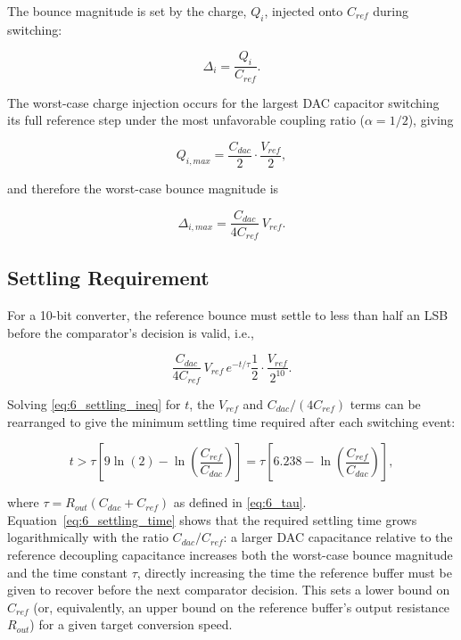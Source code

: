 The bounce magnitude is set by the charge, $Q_i$, injected onto $C_{ref}$
during switching:

\begin{equation}
	\Delta_i = \frac{Q_i}{C_{ref}}.
	\label{eq:6_delta_i}
\end{equation}

The worst-case charge injection occurs for the largest DAC capacitor
switching its full reference step under the most unfavorable coupling
ratio ($\alpha = 1/2$), giving

\begin{equation}
	Q_{i,max} = \frac{C_{dac}}{2} \cdot \frac{V_{ref}}{2},
	\label{eq:6_qimax}
\end{equation}

\noindent and therefore the worst-case bounce magnitude is

\begin{equation}
	\Delta_{i,max} = \frac{C_{dac}}{4 C_{ref}} \, V_{ref}.
	\label{eq:6_deltaimax}
\end{equation}

\subsection{Settling Requirement}

For a 10-bit converter, the reference bounce must settle to less than
half an LSB before the comparator's decision is valid, i.e.,

\begin{equation}
	\frac{C_{dac}}{4 C_{ref}} \, V_{ref} \, e^{-t/\tau} 
	\frac{1}{2} \cdot \frac{V_{ref}}{2^{10}}.
	\label{eq:6_settling_ineq}
\end{equation}

Solving \eqref{eq:6_settling_ineq} for $t$, the $V_{ref}$ and
$C_{dac}/(4C_{ref})$ terms can be rearranged to give the minimum settling
time required after each switching event:

\begin{equation}
	t > \tau \left[ 9\ln(2) - \ln\!\left(\frac{C_{ref}}{C_{dac}}\right)
	\right] = \tau \left[ 6.238 - \ln\!\left(\frac{C_{ref}}{C_{dac}}\right)
	\right],
	\label{eq:6_settling_time}
\end{equation}

\noindent where $\tau = R_{out}(C_{dac} + C_{ref})$ as defined in
\eqref{eq:6_tau}. Equation~\eqref{eq:6_settling_time} shows that the
required settling time grows logarithmically with the ratio
$C_{dac}/C_{ref}$: a larger DAC capacitance relative to the reference
decoupling capacitance increases both the worst-case bounce magnitude and
the time constant $\tau$, directly increasing the time the reference
buffer must be given to recover before the next comparator decision. This
sets a lower bound on $C_{ref}$ (or, equivalently, an upper bound on the
reference buffer's output resistance $R_{out}$) for a given target
conversion speed.
